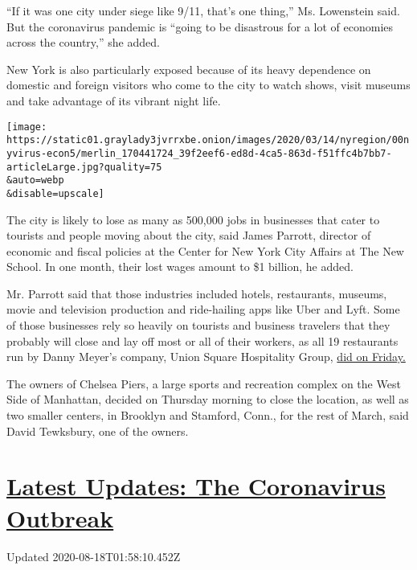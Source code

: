 ``If it was one city under siege like 9/11, that's one thing,'' Ms.
Lowenstein said. But the coronavirus pandemic is ``going to be
disastrous for a lot of economies across the country,'' she added.

New York is also particularly exposed because of its heavy dependence on
domestic and foreign visitors who come to the city to watch shows, visit
museums and take advantage of its vibrant night life.

\texttt{[image: https://static01.graylady3jvrrxbe.onion/images/2020/03/14/nyregion/00nyvirus-econ5/merlin\_170441724\_39f2eef6-ed8d-4ca5-863d-f51ffc4b7bb7-articleLarge.jpg?quality=75\\\&auto=webp\\\&disable=upscale]}

The city is likely to lose as many as 500,000 jobs in businesses that
cater to tourists and people moving about the city, said James Parrott,
director of economic and fiscal policies at the Center for New York City
Affairs at The New School. In one month, their lost wages amount to \$1
billion, he added.

Mr. Parrott said that those industries included hotels, restaurants,
museums, movie and television production and ride-hailing apps like Uber
and Lyft. Some of those businesses rely so heavily on tourists and
business travelers that they probably will close and lay off most or all
of their workers, as all 19 restaurants run by Danny Meyer's company,
Union Square Hospitality Group,
\href{https://www.nytimes3xbfgragh.onion/2020/03/13/dining/restaurant-closings-coronavirus.html}{did
on Friday.}

The owners of Chelsea Piers, a large sports and recreation complex on
the West Side of Manhattan, decided on Thursday morning to close the
location, as well as two smaller centers, in Brooklyn and Stamford,
Conn., for the rest of March, said David Tewksbury, one of the owners.

\hypertarget{latest-updates-the-coronavirus-outbreak}{%
\section{\texorpdfstring{\href{https://www.nytimes3xbfgragh.onion/2020/08/17/world/coronavirus-covid.html?action=click\&pgtype=Article\&state=default\&region=MAIN_CONTENT_1\&context=storylines_live_updates}{Latest
Updates: The Coronavirus
Outbreak}}{Latest Updates: The Coronavirus Outbreak}}\label{latest-updates-the-coronavirus-outbreak}}

Updated 2020-08-18T01:58:10.452Z

